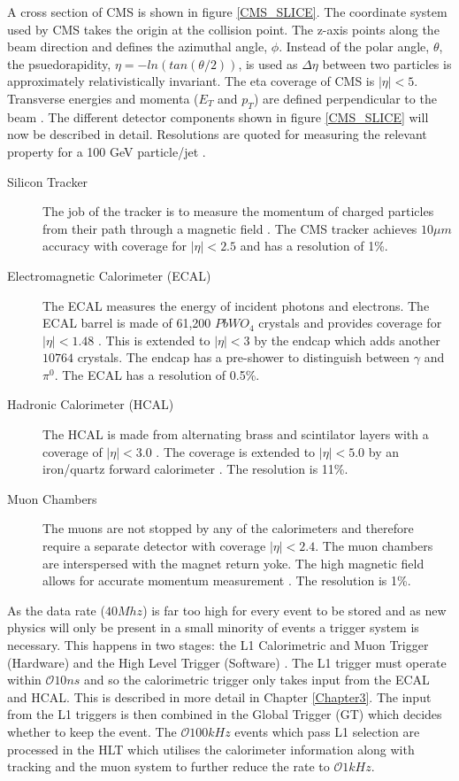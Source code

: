 A cross section of CMS is shown in figure \ref{CMS_SLICE}. The coordinate system used by CMS takes the origin at the collision point. The z-axis points along the beam direction and defines the azimuthal angle, $\phi$. Instead of the polar angle, $\theta$, the psuedorapidity, $\eta=-ln(tan(\theta/2))$, is used as $\Delta \eta$ between two particles is approximately relativistically invariant. The eta coverage of CMS is $|\eta|<5$. Transverse energies and momenta ($E_T $ and $p_T$)  are defined perpendicular to the beam \cite{cmsiop}. The different detector components shown in figure \ref{CMS_SLICE} will now be described in detail. Resolutions are quoted for measuring the relevant property for a 100 GeV particle/jet \cite{SACharacteristics}.
\begin{description}
\item[Silicon Tracker]The job of the tracker is to measure the momentum of charged particles from their path through a magnetic field \cite{siliconTDR}. The CMS tracker achieves $10\mu m$ accuracy with coverage for $|\eta|<2.5$ and has a resolution of 1\%.
\item[Electromagnetic Calorimeter (ECAL)] The ECAL measures the energy of incident photons and electrons. The ECAL barrel is made of 61,200 $PbWO_4$ crystals and provides coverage for $|\eta|<1.48$ \cite{ecal}. This is extended to $|\eta|<3$ by the endcap which adds another $10764$ crystals. The endcap has a pre-shower to distinguish between $\gamma$ and $\pi^0$. The ECAL has a resolution of 0.5\%.
 \item[Hadronic Calorimeter (HCAL)] The HCAL is made from alternating brass and scintilator layers with a coverage of $|\eta|<3.0$ \cite{hcal}. The coverage is extended to  $|\eta|<5.0$ by an iron/quartz forward calorimeter \cite{hfhcal}. The resolution is 11\%. 
 \item[Muon Chambers]The muons are not stopped by any of the calorimeters and therefore require a separate detector with coverage $|\eta| < 2.4$. The muon chambers are interspersed with the magnet return yoke. The high magnetic field allows for accurate momentum measurement \cite{muons}. The resolution is 1\%.
\end{description}
As the data rate ($40Mhz$) is far too high for every event to be stored and as new physics will only be present in a small minority of events a trigger system is necessary. This happens in two stages: the L1 Calorimetric and Muon Trigger (Hardware) and the High Level Trigger (Software) \cite{HLT}. The L1 trigger must operate within $\mathcal{O}10ns$ and so  the calorimetric trigger only takes input from the ECAL and HCAL. This is described in more detail in Chapter \ref{Chapter3}. The input from the L1 triggers is then combined in the Global Trigger (GT) which decides whether to keep the event. The $\mathcal{O}100kHz$ events which pass L1 selection are processed in the HLT which utilises the calorimeter information along with tracking and the muon system to further reduce the rate to $\mathcal{O}1kHz$.

